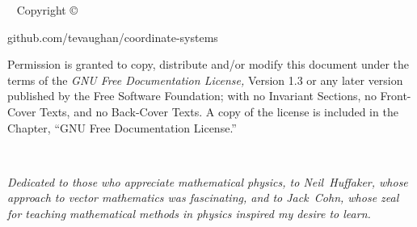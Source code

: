 

\frontmatter

\blankpage

\newpage\thispagestyle{empty}
\vfill
{}

\maketitle

\newpage
\begin{fullwidth}
~\vfill
\thispagestyle{empty}
\setlength{\parindent}{0pt}
\setlength{\parskip}{\baselineskip}
Copyright \copyright\ \the\year\ \thanklessauthor

\par{}

\par{github.com/tevaughan/coordinate-systems}

\par Permission is granted to copy, distribute and/or modify this document
   under the terms of the {\it GNU Free Documentation License,} Version 1.3 or
   any later version published by the Free Software Foundation; with no
   Invariant Sections, no Front-Cover Texts, and no Back-Cover Texts.  A copy
   of the license is included in the Chapter, ``GNU Free Documentation
   License.''

\end{fullwidth}

\tableofcontents



\cleardoublepage
~\vfill
\begin{doublespace}
\noindent\fontsize{18}{22}\selectfont\itshape
\nohyphenation
Dedicated to those who appreciate mathematical physics, to \mbox{Neil
   Huffaker}, whose approach to vector mathematics was fascinating, and to
   \mbox{Jack Cohn}, whose zeal for teaching mathematical methods in physics
   inspired my desire to learn.
\end{doublespace}
\vfill
\vfill


